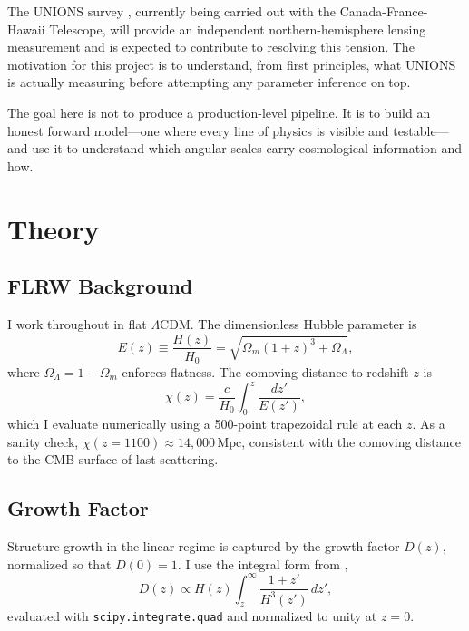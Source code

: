\documentclass[12pt, a4paper]{article}
\begin{document}
The UNIONS survey \citep[Ultraviolet Near-Infrared Northern Survey;][]{UNIONS},
currently being carried out with the Canada-France-Hawaii Telescope, will provide
an independent northern-hemisphere lensing measurement and is expected to
contribute to resolving this tension. The motivation for this project is to
understand, from first principles, what UNIONS is actually measuring before
attempting any parameter inference on top.
 
The goal here is not to produce a production-level pipeline. It is to build
an honest forward model---one where every line of physics is visible and
testable---and use it to understand which angular scales carry cosmological
information and how.
 
\section{Theory}
 
\subsection{FLRW Background}
 
I work throughout in flat $\Lambda$CDM. The dimensionless Hubble parameter is
\begin{equation}
    E(z) \equiv \frac{H(z)}{H_0} = \sqrt{\Omega_m(1+z)^3 + \Omega_\Lambda},
\end{equation}
where $\Omega_\Lambda = 1 - \Omega_m$ enforces flatness. The comoving distance
to redshift $z$ is
\begin{equation}
    \chi(z) = \frac{c}{H_0} \int_0^z \frac{dz'}{E(z')},
\end{equation}
which I evaluate numerically using a 500-point trapezoidal rule at each $z$.
As a sanity check, $\chi(z=1100) \approx 14{,}000\,\mathrm{Mpc}$, consistent
with the comoving distance to the CMB surface of last scattering.
 
\subsection{Growth Factor}
 
Structure growth in the linear regime is captured by the growth factor $D(z)$,
normalized so that $D(0) = 1$. I use the integral form from \citet{Heath1977},
\begin{equation}
    D(z) \propto H(z)\int_z^\infty \frac{1+z'}{H^3(z')}\,dz',
\end{equation}
evaluated with \texttt{scipy.integrate.quad} and normalized to unity at $z=0$.
 
\end{document}

